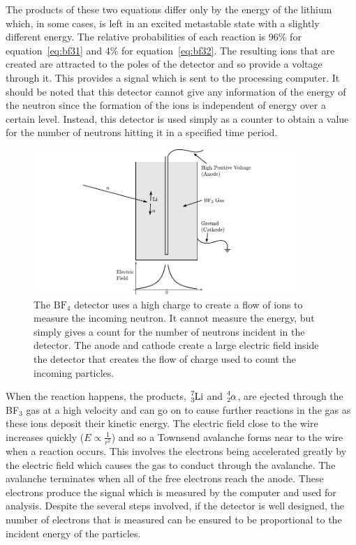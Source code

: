 The products of these two equations differ only by the energy of the lithium which, in some cases, is left in an excited metastable state with a slightly different energy. The relative probabilities of each reaction is 96\% for equation~\ref{eq:bf31} and 4\% for equation~\ref{eq:bf32}\cite{baratta}. The resulting ions that are created are attracted to the poles of the detector and so provide a voltage through it. This provides a signal which is sent to the processing computer. It should be noted that this detector cannot give any information of the energy of the neutron since the formation of the ions is independent of energy over a certain level. Instead, this detector is used simply as a counter to obtain a value for the number of neutrons hitting it in a specified time period. 
\begin{figure}[ht]
	\centering
	\includegraphics[width=0.9\textwidth]{BF3detector.pdf}
	\caption{The $\text{BF}_4$ detector uses a high charge to create a flow of ions to measure the incoming neutron. It cannot measure the energy, but simply gives a count for the number of neutrons incident in the detector. The anode and cathode create a large electric field inside the detector that creates the flow of charge used to count the incoming particles.\label{fig:bf3detector}}
\end{figure}

When the reaction happens, the products, $\cf{^{7}_{3}Li}$ and $\cf{^4_2\alpha}$, are ejected through the BF$_3$ gas at a high velocity and can go on to cause further reactions in the gas as these ions deposit their kinetic energy. The electric field close to the wire increases quickly ($E\propto\frac{1}{r^2}$) and so a Townsend avalanche forms near to the wire when a reaction occurs. This involves the electrons being accelerated greatly by the electric field which causes the gas to conduct through the avalanche. The avalanche terminates when all of the free electrons reach the anode. These electrons produce the signal which is measured by the computer and used for analysis. Despite the several steps involved, if the detector is well designed, the number of electrons that is measured can be ensured to be proportional to the incident energy of the particles\cite{krane}.


